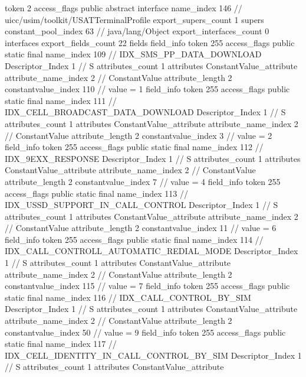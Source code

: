 {{{			token	2
			access_flags	public abstract interface
			name_index	146		// uicc/usim/toolkit/USATTerminalProfile
			export_supers_count	1
			supers {
				constant_pool_index	63		// java/lang/Object
			}
			export_interfaces_count	0
			interfaces {
			}
			export_fields_count	22
			fields {
			field_info {
				token	255
				access_flags	public static final
				name_index	109		// IDX_SMS_PP_DATA_DOWNLOAD
				Descriptor_Index	1		// S
				attributes_count	1
				attributes {
				ConstantValue_attribute {
					attribute_name_index	2		// ConstantValue
					attribute_length	2
					constantvalue_index	110		// value = 1
				}
				}
			}
			field_info {
				token	255
				access_flags	public static final
				name_index	111		// IDX_CELL_BROADCAST_DATA_DOWNLOAD
				Descriptor_Index	1		// S
				attributes_count	1
				attributes {
				ConstantValue_attribute {
					attribute_name_index	2		// ConstantValue
					attribute_length	2
					constantvalue_index	3		// value = 2
				}
				}
			}
			field_info {
				token	255
				access_flags	public static final
				name_index	112		// IDX_9EXX_RESPONSE
				Descriptor_Index	1		// S
				attributes_count	1
				attributes {
				ConstantValue_attribute {
					attribute_name_index	2		// ConstantValue
					attribute_length	2
					constantvalue_index	7		// value = 4
				}
				}
			}
			field_info {
				token	255
				access_flags	public static final
				name_index	113		// IDX_USSD_SUPPORT_IN_CALL_CONTROL
				Descriptor_Index	1		// S
				attributes_count	1
				attributes {
				ConstantValue_attribute {
					attribute_name_index	2		// ConstantValue
					attribute_length	2
					constantvalue_index	11		// value = 6
				}
				}
			}
			field_info {
				token	255
				access_flags	public static final
				name_index	114		// IDX_CALL_CONTROLL_AUTOMATIC_REDIAL_MODE
				Descriptor_Index	1		// S
				attributes_count	1
				attributes {
				ConstantValue_attribute {
					attribute_name_index	2		// ConstantValue
					attribute_length	2
					constantvalue_index	115		// value = 7
				}
				}
			}
			field_info {
				token	255
				access_flags	public static final
				name_index	116		// IDX_CALL_CONTROL_BY_SIM
				Descriptor_Index	1		// S
				attributes_count	1
				attributes {
				ConstantValue_attribute {
					attribute_name_index	2		// ConstantValue
					attribute_length	2
					constantvalue_index	50		// value = 9
				}
				}
			}
			field_info {
				token	255
				access_flags	public static final
				name_index	117		// IDX_CELL_IDENTITY_IN_CALL_CONTROL_BY_SIM
				Descriptor_Index	1		// S
				attributes_count	1
				attributes {
				ConstantValue_attribute {
}}}}}}}
